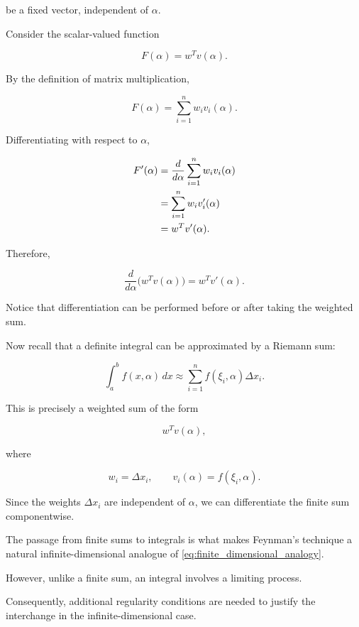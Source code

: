 \documentclass[11pt,a4paper]{article}
\theoremstyle{definition}
\theoremstyle{remark}
\begin{document}
be a fixed vector,
independent of $\alpha$.

Consider the scalar-valued
function

\[
    F(\alpha)=w^Tv(\alpha).
\]

By the definition of
matrix multiplication,

\[
    F(\alpha)
    =
    \sum_{i=1}^{n}
    w_i v_i(\alpha).
\]

Differentiating with
respect to $\alpha$,

\begin{align}
    F'(\alpha)
    &=
    \frac{d}{d\alpha}
    \sum_{i=1}^{n}
    w_i v_i(\alpha)
    \notag\\
    &=
    \sum_{i=1}^{n}
    w_i v_i'(\alpha)
    \notag\\
    &=
    w^Tv'(\alpha).
\end{align}

Therefore,

\begin{equation}
    \boxed{
    \frac{d}{d\alpha}
    \bigl(w^Tv(\alpha)\bigr)
    =
    w^Tv'(\alpha).
    }
    \label{eq:finite_dimensional_analogy}
\end{equation}

Notice that differentiation
can be performed before
or after taking the
weighted sum.

Now recall that a definite
integral can be approximated
by a Riemann sum:

\[
    \int_a^b f(x,\alpha)\,dx
    \approx
    \sum_{i=1}^{n}
    f(\xi_i,\alpha)\Delta x_i.
\]

This is precisely a
weighted sum of the form

\[
    w^Tv(\alpha),
\]

where

\[
    w_i=\Delta x_i,
    \qquad
    v_i(\alpha)=f(\xi_i,\alpha).
\]

Since the weights
$\Delta x_i$ are
independent of $\alpha$,
we can differentiate
the finite sum
componentwise.

The passage from finite
sums to integrals is
what makes Feynman's
technique a natural
infinite-dimensional
analogue of
\eqref{eq:finite_dimensional_analogy}.

However, unlike a finite
sum, an integral involves
a limiting process.

Consequently, additional
regularity conditions
are needed to justify
the interchange in the
infinite-dimensional case.

\end{document}
